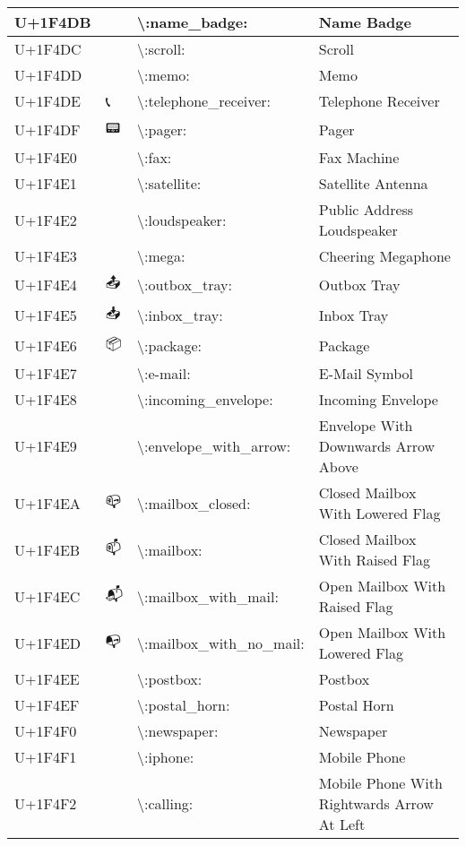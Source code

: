 \begin{table}[h]
\begin{tabulary}{\linewidth}{|L|L|L|L|}
\hline
U+1F4DB & 📛 & {\textbackslash}:name\_badge: & Name Badge \\
\hline
U+1F4DC & 📜 & {\textbackslash}:scroll: & Scroll \\
\hline
U+1F4DD & 📝 & {\textbackslash}:memo: & Memo \\
\hline
U+1F4DE & 📞 & {\textbackslash}:telephone\_receiver: & Telephone Receiver \\
\hline
U+1F4DF & 📟 & {\textbackslash}:pager: & Pager \\
\hline
U+1F4E0 & 📠 & {\textbackslash}:fax: & Fax Machine \\
\hline
U+1F4E1 & 📡 & {\textbackslash}:satellite: & Satellite Antenna \\
\hline
U+1F4E2 & 📢 & {\textbackslash}:loudspeaker: & Public Address Loudspeaker \\
\hline
U+1F4E3 & 📣 & {\textbackslash}:mega: & Cheering Megaphone \\
\hline
U+1F4E4 & 📤 & {\textbackslash}:outbox\_tray: & Outbox Tray \\
\hline
U+1F4E5 & 📥 & {\textbackslash}:inbox\_tray: & Inbox Tray \\
\hline
U+1F4E6 & 📦 & {\textbackslash}:package: & Package \\
\hline
U+1F4E7 & 📧 & {\textbackslash}:e-mail: & E-Mail Symbol \\
\hline
U+1F4E8 & 📨 & {\textbackslash}:incoming\_envelope: & Incoming Envelope \\
\hline
U+1F4E9 & 📩 & {\textbackslash}:envelope\_with\_arrow: & Envelope With Downwards Arrow Above \\
\hline
U+1F4EA & 📪 & {\textbackslash}:mailbox\_closed: & Closed Mailbox With Lowered Flag \\
\hline
U+1F4EB & 📫 & {\textbackslash}:mailbox: & Closed Mailbox With Raised Flag \\
\hline
U+1F4EC & 📬 & {\textbackslash}:mailbox\_with\_mail: & Open Mailbox With Raised Flag \\
\hline
U+1F4ED & 📭 & {\textbackslash}:mailbox\_with\_no\_mail: & Open Mailbox With Lowered Flag \\
\hline
U+1F4EE & 📮 & {\textbackslash}:postbox: & Postbox \\
\hline
U+1F4EF & 📯 & {\textbackslash}:postal\_horn: & Postal Horn \\
\hline
U+1F4F0 & 📰 & {\textbackslash}:newspaper: & Newspaper \\
\hline
U+1F4F1 & 📱 & {\textbackslash}:iphone: & Mobile Phone \\
\hline
U+1F4F2 & 📲 & {\textbackslash}:calling: & Mobile Phone With Rightwards Arrow At Left \\

\end{tabulary}
\end{table}
